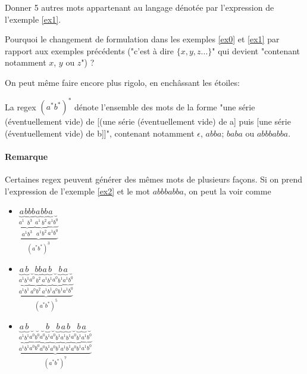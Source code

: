 \begin{exercice}
Donner 5 autres mots appartenant au langage dénotée par l'expression de l'exemple \ref{ex1}. 
\end{exercice}

\begin{exercice}
Pourquoi le changement de formulation dans les exemples \ref{ex0} et \ref{ex1} par rapport aux exemples précédents ("c'est à dire $\{x, y, z ... \}$" qui devient "contenant notamment $x$, $y$ ou $z$") ?
\end{exercice}

On peut même faire encore plus rigolo, en enchâssant les étoiles:


\begin{example}
\label{ex2}
La regex $(a^*b^*)^*$ dénote l'ensemble des mots de la forme "une série (éventuellement vide) de [(une série (éventuellement vide) de a] puis [une série (éventuellement vide) de b]]", contenant notamment $\epsilon$, $abba$; $baba$ ou $abbbabba$. 
\end{example}

\paragraph{Remarque} Certaines regex peuvent générer des mêmes mots de plusieurs façons. Si on prend l'expression de l'exemple \ref{ex2} et le mot $abbbabba$, on peut la voir comme 

\begin{itemize}
    \item $\underbrace{\underbrace{\underbrace{a}_\text{$a^1$}\underbrace{bbb}_\text{$b^3$}}_\text{$a^1b^3$}\underbrace{\underbrace{a}_\text{$a^1$}\underbrace{bb}_\text{$b^2$}}_\text{$a^1b^2$}\underbrace{\underbrace{a}_\text{$a^1$}\underbrace{ }_\text{$b^0$}}_\text{$a^1b^0$}}_\text{$(a^*b^*)^3$}$   
    \item $\underbrace{\underbrace{\underbrace{a}_\text{$a^1$}\underbrace{b}_\text{$b^1$}}_\text{$a^1b^1$}\underbrace{\underbrace{ }_\text{$a^0$}\underbrace{bb}_\text{$b^2$}}_\text{$a^0b^2$}\underbrace{\underbrace{a}_\text{$a^1$}\underbrace{b }_\text{$b^1$}}_\text{$a^1b^1$}\underbrace{\underbrace{ }_\text{$a^0$}\underbrace{b }_\text{$b^1$}}_\text{$a^0b^1$}\underbrace{\underbrace{a}_\text{$a^1$}\underbrace{  }_\text{$b^0$}}_\text{$a^1b^0$}}_\text{$(a^*b^*)^5$}$
   
    \item $\underbrace{\underbrace{\underbrace{a}_\text{$a^1$}\underbrace{b}_\text{$b^1$}}_\text{$a^1b^1$}\underbrace{\underbrace{ }_\text{$a^0$}\underbrace{ }_\text{$b^0$}}_\text{$a^0b^0$}\underbrace{\underbrace{ }_\text{$a^0$}\underbrace{b}_\text{$b^1$}}_\text{$a^0b^1$}\underbrace{\underbrace{ }_\text{$a^0$}\underbrace{b}_\text{$b^1$}}_\text{$a^0b^1$}\underbrace{\underbrace{a}_\text{$a^1$}\underbrace{b }_\text{$b^1$}}_\text{$a^1b^1$}\underbrace{\underbrace{ }_\text{$a^0$}\underbrace{b }_\text{$b^1$}}_\text{$a^0b^1$}\underbrace{\underbrace{a}_\text{$a^1$}\underbrace{  }_\text{$b^0$}}_\text{$a^1b^0$}}_\text{$(a^*b^*)^7$}$
\end{itemize}

